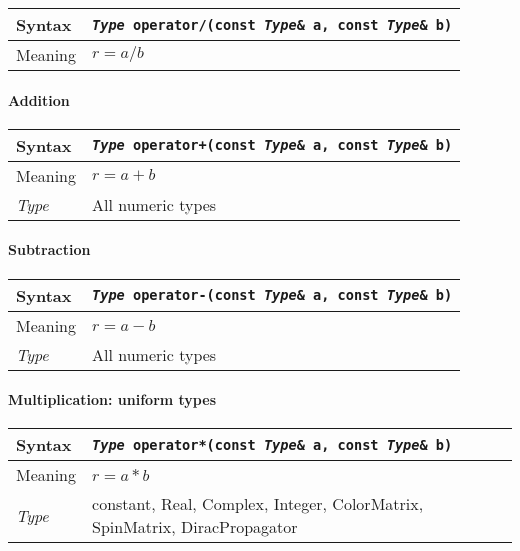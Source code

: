 \documentclass[12pt,letterpaper]{article}
\newcommand{\tConstant}{constant}
\newcommand{\tReal}{Real}
\newcommand{\tComplex}{Complex}
\newcommand{\tInt}{Integer}
\newcommand{\tColorMatrix}{ColorMatrix}
\newcommand{\tDiracPropagator}{DiracPropagator}
\newcommand{\tSpinMatrix}{SpinMatrix}
\newcommand{\allNumericTypes}{All numeric types}
\newcommand{\itt}{\it Type}
\newcommand{\protoBBinaryQual}[1]{{\tt {\it Type} #1(const {\it Type}\& a, const {\it Type}\& b)}}
\begin{document}
\begin{flushleft}
  \begin{tabular}{|l|l|}
  \hline
  Syntax      & \protoBBinaryQual{operator/} \\
  \hline
  Meaning     & $r = a/b$ \\
  \hline
  \end{tabular}
\end{flushleft}

\paragraph{Addition}

\begin{flushleft}
  \begin{tabular}{|l|l|}
  \hline
  Syntax      & \protoBBinaryQual{operator+} \\
  \hline
  Meaning     & $r = a + b$ \\
  \hline
  \itt        & \allNumericTypes \\
  \hline
  \end{tabular}
\end{flushleft}

\paragraph{Subtraction}

\begin{flushleft}
  \begin{tabular}{|l|l|}
  \hline
  Syntax      & \protoBBinaryQual{operator-} \\
  \hline
  Meaning     & $r = a - b$ \\
  \hline
  \itt        & \allNumericTypes \\
  \hline
  \end{tabular}
\end{flushleft}

\paragraph{Multiplication: uniform types}

\begin{flushleft}
  \begin{tabular}{|l|l|}
  \hline
  Syntax      & \protoBBinaryQual{operator*} \\
  \hline
  Meaning     & $r = a * b$ \\
  \hline
  \itt        & \tConstant, \tReal, \tComplex, \tInt, \tColorMatrix, \tSpinMatrix, \tDiracPropagator\\
  \hline
  \end{tabular}
\end{flushleft}
\end{document}
